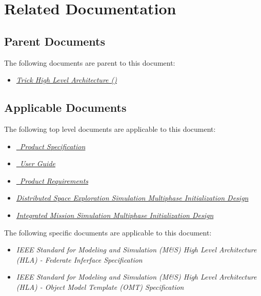 \chapter{Related Documentation}\label{sec:docs}

\section{Parent Documents}
The following documents are parent to this document:

\begin{itemize}
\item{\href{file:TrickHLA.pdf}
           {\em Trick High Level Architecture (\TrickHLA)}}
\cite{trickhlaenv:TrickHLA}
\end{itemize}

\section{Applicable Documents}
The following top level documents are applicable to this document:

\begin{itemize}
\item{\href{file:TrickHLASpec.pdf}
           {\em \TrickHLA\ Product Specification}}
\cite{trickhlaenv:TrickHLASpec}

\item{\href{file:TrickHLAUser.pdf}
           {\em \TrickHLA\ User Guide}}
\cite{trickhlaenv:TrickHLAUser}

\item{\href{file:TrickHLAReqt.pdf}
           {\em \TrickHLA\ Product Requirements}}
\cite{trickhlaenv:TrickHLAReqt}

\item{\href{file:DSES\_Multiphase\_Init\_Design\_Document.pdf}
           {\em Distributed Space Exploration Simulation Multiphase Initialization Design}}
\cite{trickhlaenv:DSES-multiphase-init-design}

\item{\href{file:IMSim_Multiphase_Init_Design_Document.pdf}
           {\em Integrated Mission Simulation Multiphase Initialization Design}}
\cite{trickhlaenv:IMSim-multiphase-init-design}

\end{itemize}

The following specific documents are applicable to this document:

\begin{itemize}
\item{\em IEEE Standard for Modeling and Simulation (M\&S) High Level
          Architecture (HLA) - Federate Inferface Specification}
\cite{IEEE1516:API}

\item{\em IEEE Standard for Modeling and Simulation (M\&S) High Level
              Architecture (HLA) - Object Model Template (OMT) Specification}
\cite{IEEE1516:OMT}

\end{itemize}

